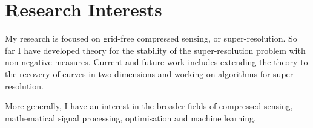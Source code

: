 \documentclass[11pt,a4paper,roman]{moderncv} %
\begin{document}


%
%
%
%
%


\makecvtitle %




\section{Research Interests}
My research is focused on grid-free compressed sensing, or super-resolution. So far I have developed theory for the stability of the super-resolution problem with non-negative measures. Current and future work includes extending the theory to the recovery of curves in two dimensions and working on algorithms for super-resolution.
\newline

More generally, I have an interest in the broader fields of compressed sensing, mathematical signal processing, optimisation and machine learning.


\end{document}
